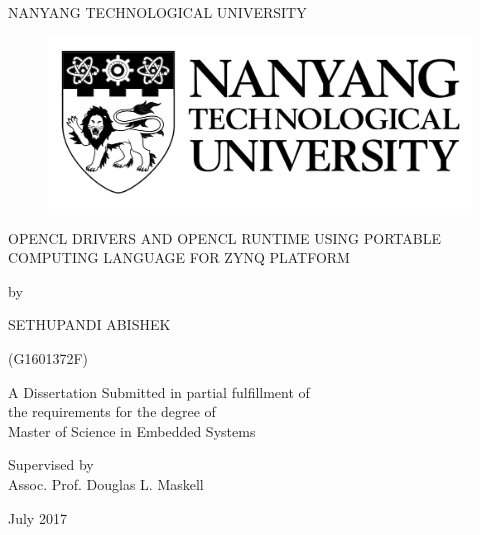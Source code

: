 \begin{titlepage}
\begin{center}
{\LARGE {NANYANG TECHNOLOGICAL UNIVERSITY}}
\begin{figure}[!t]
\centering
\includegraphics[width= 8 cm]{figures/ntu_logo.pdf}
\end{figure} 
\vspace*{0.7in}
{\large OPENCL DRIVERS AND OPENCL RUNTIME USING PORTABLE COMPUTING LANGUAGE FOR ZYNQ PLATFORM}
\par
\vspace{0.4 in}
{\large by\\}
\vspace{0.2 in}
{\large SETHUPANDI ABISHEK

(G1601372F)}
\vspace{0.1 in}
\par
\vfill
A Dissertation Submitted in partial fulfillment of \\ the requirements for the degree of \\ Master of Science in Embedded Systems
\par
\vspace{0.4in}
Supervised by\\
\vspace{0.1in}
{\large Assoc. Prof. Douglas L. Maskell \\}
\par
\vspace{0.15in}
July 2017
\end{center}
\end{titlepage}